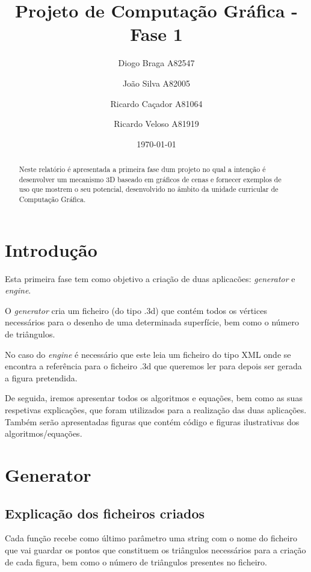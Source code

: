 \documentclass[a4paper]{article}
\title{Projeto de Computação Gráfica - Fase 1}
\author{Diogo Braga A82547 \and João Silva A82005 \and Ricardo Caçador A81064
\and Ricardo Veloso A81919}
\date{\today}
\begin{document}
\maketitle

\begin{abstract}
Neste relatório é apresentada a primeira fase dum projeto no qual a intenção é desenvolver um mecanismo 3D baseado em gráficos de cenas e fornecer exemplos de uso que mostrem o seu potencial, desenvolvido no âmbito da unidade curricular de Computação Gráfica.
\end{abstract}

\tableofcontents

\newpage


\section{Introdução}
\label{sec:intro}

Esta primeira fase tem como objetivo a criação de duas aplicacões: \textit{generator} e \textit{engine}.

O \textit{generator} cria um ficheiro (do tipo .3d) que contém todos os vértices necessários para o desenho de uma determinada superfície, bem como o número de triângulos.

No caso do \textit{engine} é necessário que este leia um ficheiro do tipo XML onde se encontra a referência para o ficheiro .3d que queremos ler para depois ser gerada a figura pretendida.

De seguida, iremos apresentar todos os algoritmos e equações, bem como as suas respetivas explicações, que foram utilizados para a realização das duas aplicações. Também serão apresentadas figuras que contém código e figuras ilustrativas dos algoritmos/equações.

\section{Generator}
\label{sec:generator}

\subsection{Explicação dos ficheiros criados}
\label{sec:ficheiros}

Cada função recebe como último parâmetro uma string com o nome do ficheiro que vai guardar os pontos que constituem os triângulos necessários para a criação de cada figura, bem como o número de triângulos presentes no ficheiro.
\end{document}
